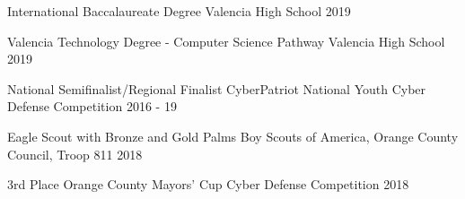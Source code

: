



\begin{cvhonors}

  \cvhonor
    {International Baccalaureate Degree} %
    {Valencia High School} %
    {} %
    {2019} %

  \cvhonor
    {Valencia Technology Degree - Computer Science Pathway} %
    {Valencia High School} %
    {} %
    {2019} %

  \cvhonor
    {National Semifinalist/Regional Finalist} %
    {CyberPatriot National Youth Cyber Defense Competition} %
    {} %
    {2016 - 19} %
    
  \cvhonor
    {Eagle Scout with Bronze and Gold Palms} %
    {Boy Scouts of America, Orange County Council, Troop 811} %
    {} %
    {2018} %

  \cvhonor
    {3rd Place} %
    {Orange County Mayors' Cup Cyber Defense Competition} %
    {} %
    {2018} %



\end{cvhonors}





